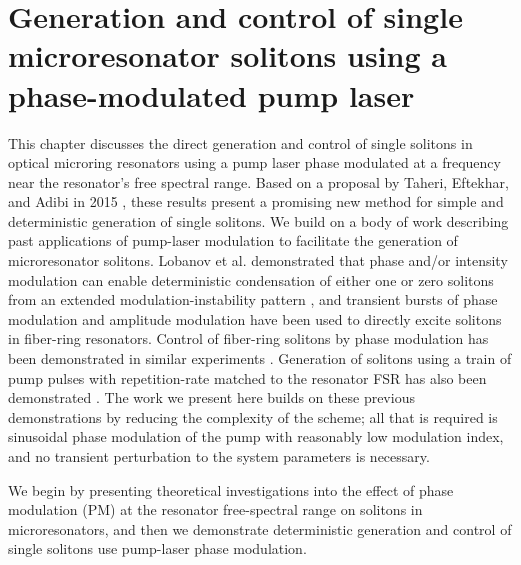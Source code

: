  \chapter{Generation and control of single microresonator solitons using a phase-modulated pump laser} \label{chap:PMPumping}

This chapter discusses the direct generation and control of single solitons in optical microring resonators using a pump laser phase modulated at a frequency near the resonator's free spectral range. Based on a proposal by Taheri, Eftekhar, and Adibi in 2015 \cite{Taheri2015}, these results present a promising new method for simple and deterministic generation of single solitons. We build on a body of work describing past applications of pump-laser modulation to facilitate the generation of microresonator solitons. Lobanov et al. demonstrated that phase and/or intensity modulation can enable deterministic condensation of either one or zero solitons from an extended modulation-instability pattern \cite{Lobanov2016}, and transient bursts of phase modulation \cite{Jang2015} and amplitude modulation \cite{Wang2018} have been used to directly excite solitons in fiber-ring resonators. Control of fiber-ring solitons by phase modulation has been demonstrated in similar experiments \cite{Jang2015a}. Generation of solitons using a train of pump pulses with repetition-rate matched to the resonator FSR has also been demonstrated \cite{Obrzud2017}. The work we present here builds on these previous demonstrations by reducing the complexity of the scheme; all that is required is sinusoidal phase modulation of the pump with reasonably low modulation index, and no transient perturbation to the system parameters is necessary.

We begin by presenting theoretical investigations into the effect of phase modulation (PM) at the resonator free-spectral range on solitons in microresonators, and then we demonstrate deterministic generation and control of single solitons use pump-laser phase modulation.



